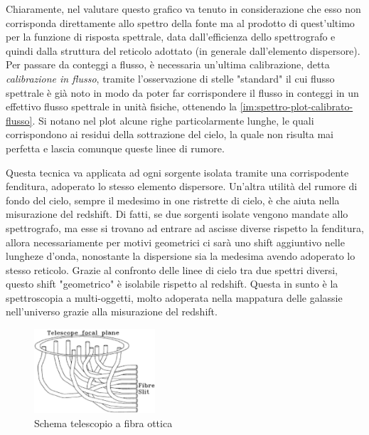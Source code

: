 Chiaramente, nel valutare questo grafico va tenuto in considerazione che esso non corrisponda direttamente allo spettro della fonte ma al prodotto di quest'ultimo per la funzione di risposta spettrale, data dall'efficienza dello spettrografo e quindi dalla struttura del reticolo adottato (in generale dall'elemento dispersore). Per passare da conteggi a flusso, è necessaria un'ultima calibrazione, detta \textit{calibrazione in flusso}, tramite l'osservazione di stelle "standard" il cui flusso spettrale è già noto in modo da poter far corrispondere il flusso in conteggi in un effettivo flusso spettrale in unità fisiche, ottenendo la \ref{im:spettro-plot-calibrato-flusso}. Si notano nel plot alcune righe particolarmente lunghe, le quali corrispondono ai residui della sottrazione del cielo, la quale non risulta mai perfetta e lascia comunque queste linee di rumore.

Questa tecnica va applicata ad ogni sorgente isolata tramite una corrispodente fenditura, adoperato lo stesso elemento dispersore. Un'altra utilità del rumore di fondo del cielo, sempre il medesimo in one ristrette di cielo, è che aiuta nella misurazione del redshift. Di fatti, se due sorgenti isolate vengono mandate allo spettrografo, ma esse si trovano ad entrare ad ascisse diverse rispetto la fenditura, allora necessariamente per motivi geometrici ci sarà uno shift aggiuntivo nelle lungheze d'onda, nonostante la dispersione sia la medesima avendo adoperato lo stesso reticolo. Grazie al confronto delle linee di cielo tra due spettri diversi, questo shift "geometrico" è isolabile rispetto al redshift. Questa in sunto è la spettroscopia a multi-oggetti, molto adoperata nella mappatura delle galassie nell'universo grazie alla misurazione del redshift.

\begin{figure}
    \centering
    \vspace{-10pt}
    \includegraphics[width=0.4\textwidth]{Immagini/Capitolo3/Telescopio_schema_fibra.PNG}
    \caption*{Schema telescopio a fibra ottica}
    \vspace{-5pt}
\end{figure}

